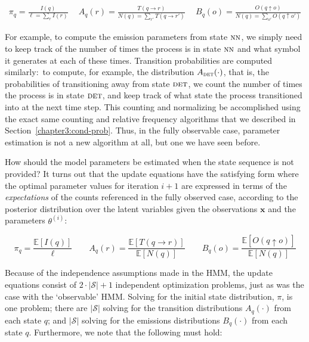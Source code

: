 \begin{eqnarray}
\label{eq:chapter6_hmmopt} \pi_q = \frac{I(q)}{\ell = \sum_{r} I(r)} \quad \ A_q(r) = \frac{T(q \rightarrow r)}{N(q) = \sum_{r'} T(q \rightarrow r')} \quad\  B_q(o) = \frac{O(q \uparrow o)}{N(q) = \sum_{o'} O(q \uparrow o')}
\end{eqnarray}

\noindent For example, to compute the emission parameters from state
$\textsc{nn}$, we simply need to keep track of the number of times the
process is in state $\textsc{nn}$ and what symbol it generates at each
of these times.  Transition probabilities are computed similarly:\ to
compute, for example, the distribution $A_{\textsc{det}}(\cdot)$, that
is, the probabilities of transitioning away from state $\textsc{det}$,
we count the number of times the process is in state $\textsc{det}$,
and keep track of what state the process transitioned into at the next
time step.  This counting and normalizing be accomplished using the
exact same counting and relative frequency algorithms that we
described in Section~\ref{chapter3:cond-prob}.  Thus, in the fully
observable case, parameter estimation is not a new algorithm at all,
but one we have seen before.

How should the model parameters be estimated when the state sequence
is not provided?  It turns out that the update equations have the
satisfying form where the optimal parameter values for iteration $i+1$
are expressed in terms of the \emph{expectations} of the counts
referenced in the fully observed case, according to the posterior
distribution over the latent variables given the observations
$\textbf{x}$ and the parameters $\theta^{(i)}$:

\begin{equation}
\pi_q = \frac{\mathbb{E}[I(q)]}{\ell} \quad \quad A_q(r) = \frac{\mathbb{E}[T(q \rightarrow r)]}{\mathbb{E}[N(q)]} \quad \quad B_q(o) = \frac{\mathbb{E}[O(q \uparrow o)]}{\mathbb{E}[N(q)]}
\label{chapter6_hmm_update}
\end{equation}

\noindent Because of the independence assumptions made in the HMM, the
update equations consist of $2\cdot |\mathcal{S}| + 1$ independent
optimization problems, just as was the case with the `observable' HMM.
Solving for the initial state distribution, $\pi$, is one problem;
there are $|\mathcal{S}|$ solving for the transition distributions
$A_q(\cdot)$ from each state $q$; and $|\mathcal{S}|$ solving for the
emissions distributions $B_q(\cdot)$ from each state $q$.
Furthermore, we note that the following must hold:


